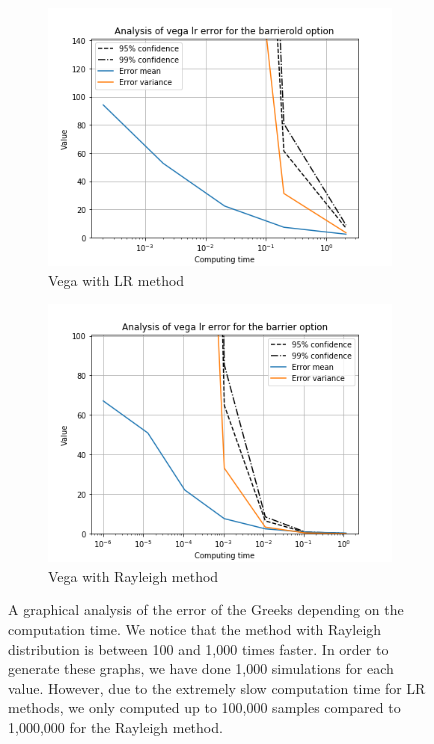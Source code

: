 \documentclass[11pt,a4paper,fleqn]{article}
\begin{document}
\begin{figure}[h!]
      \begin{subfigure}[b]{0.45\textwidth}
          \includegraphics[width=\textwidth]{graphs/barrieroldvegalrtime.png}
          \caption{Vega with LR method}
      \end{subfigure}
      \begin{subfigure}[b]{0.45\textwidth}
          \includegraphics[width=\textwidth]{graphs/barriervegalrtime.png}
          \caption{Vega with Rayleigh method}
      \end{subfigure}

      \caption{\label{fig:barriergraphs}A graphical analysis of the error of the Greeks depending on the computation time. We notice that the method with Rayleigh distribution is between 100 and 1,000 times faster. In order to generate these graphs, we have done 1,000 simulations for each value. However, due to the extremely slow computation time for LR methods, we only computed up to 100,000 samples compared to 1,000,000 for the Rayleigh method.}
\end{figure}
\FloatBarrier
\end{document}
